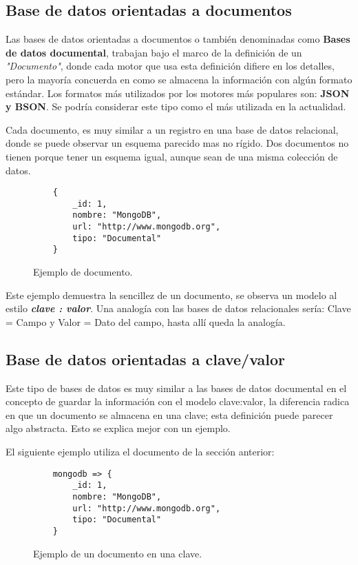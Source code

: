 \subsection{Base de datos orientadas a documentos}

Las bases de datos orientadas a documentos o tambi\'en denominadas como {\bf Bases de datos documental}, trabajan bajo el marco de la definici\'on de un \textit{"Documento"}, donde cada motor que usa esta definici\'on difiere en los detalles, pero la mayor\'ia concuerda en como se almacena la informaci\'on con alg\'un formato est\'andar. Los formatos m\'as utilizados por los motores m\'as populares son: {\bf JSON y BSON}. Se podr\'ia  considerar este tipo como el m\'as utilizada en la actualidad.

Cada documento, es muy similar a un registro en una base de datos relacional, donde se puede observar un esquema parecido mas no r\'igido. Dos documentos no tienen porque tener un esquema igual, aunque sean de una misma colecci\'on de datos.

\begin{figure}[!ht]
    \centering
    \begin{lstlisting}
    {
	    _id: 1,
	    nombre: "MongoDB",
	    url: "http://www.mongodb.org",
	    tipo: "Documental"
    }
    \end{lstlisting}
    \caption[Bases de datos documental]{Ejemplo de documento.}
\end{figure}

Este ejemplo demuestra la sencillez de un documento, se observa un modelo al estilo \textit{\textbf{clave : valor}}. Una analog\'ia con las bases de datos relacionales ser\'ia: Clave = Campo y Valor = Dato del campo, hasta all\'i queda la analog\'ia.

\subsection{Base de datos orientadas a clave/valor}

Este tipo de bases de datos es muy similar a las bases de datos documental en el concepto de guardar la informaci\'on con el modelo clave:valor, la diferencia radica en que un documento se almacena en una clave; esta definici\'on puede parecer algo abstracta. Esto se explica mejor con un ejemplo.

El siguiente ejemplo utiliza el documento de la secci\'on anterior:

\begin{figure}[!ht]
    \centering
    \begin{lstlisting}
    mongodb => {
	    _id: 1,
	    nombre: "MongoDB",
	    url: "http://www.mongodb.org",
	    tipo: "Documental"
    }
    \end{lstlisting}
    \caption[Bases de datos clave/valor]{Ejemplo de un documento en una clave.}
\end{figure}

